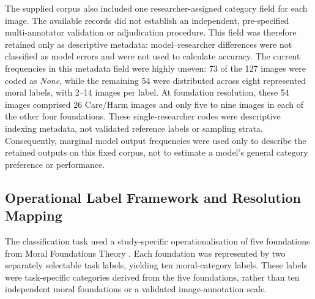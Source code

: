The supplied corpus also included one researcher-assigned category field for
each image. The available records did not establish an independent,
pre-specified multi-annotator validation or adjudication procedure. This field
was therefore retained only as descriptive metadata: model--researcher
differences were not classified as model errors and were not used to calculate
accuracy. The current frequencies in this metadata field were highly uneven:
73 of the 127 images were coded as \textit{None}, while the remaining 54 were
distributed across eight represented moral labels, with 2--14 images per label.
At foundation resolution, these 54 images comprised 26 Care/Harm images and
only five to nine images in each of the other four foundations. These
single-researcher codes were descriptive indexing metadata, not validated
reference labels or sampling strata. Consequently, marginal model output
frequencies were used only to describe the retained outputs on this fixed
corpus, not to estimate a model's general category preference or performance.

\subsection{Operational Label Framework and Resolution Mapping}
\label{subsec:category_framework}

The classification task used a study-specific operationalisation of five
foundations from Moral Foundations Theory
\cite{graham2009liberals,graham2011mapping}. Each foundation was represented by
two separately selectable task labels, yielding ten moral-category labels.
These labels were task-specific categories derived from the five foundations,
rather than ten independent moral foundations or a validated image-annotation
scale.

